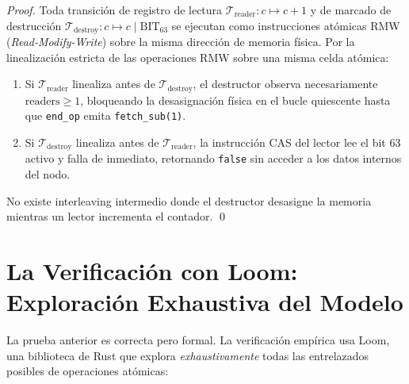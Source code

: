 \begin{proof}
Toda transición de registro de lectura $\mathcal{T}_{\text{reader}}: c \mapsto c + 1$ y de
marcado de destrucción $\mathcal{T}_{\text{destroy}}: c \mapsto c \mid \text{BIT}_{63}$
se ejecutan como instrucciones atómicas RMW (\textit{Read-Modify-Write}) sobre la misma dirección de memoria física.
Por la linealización estricta de las operaciones RMW sobre una misma celda atómica:
\begin{enumerate}
\item Si $\mathcal{T}_{\text{reader}}$ linealiza antes de $\mathcal{T}_{\text{destroy}}$, el destructor observa necesariamente $\text{readers} \ge 1$, bloqueando la desasignación física en el bucle quiescente hasta que \texttt{end\_op} emita \texttt{fetch\_sub(1)}.
\item Si $\mathcal{T}_{\text{destroy}}$ linealiza antes de $\mathcal{T}_{\text{reader}}$, la instrucción CAS del lector lee el bit 63 activo y falla de inmediato, retornando \texttt{false} sin acceder a los datos internos del nodo.
\end{enumerate}
No existe interleaving intermedio donde el destructor desasigne la memoria mientras un lector incrementa el contador. \qed
\end{proof}

\section{La Verificación con Loom: Exploración Exhaustiva del Modelo}

La prueba anterior es correcta pero formal. La verificación empírica usa Loom,
una biblioteca de Rust que explora \textit{exhaustivamente} todas las
entrelazados posibles de operaciones atómicas:


